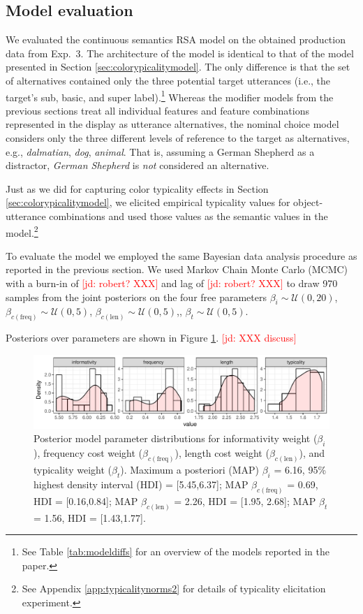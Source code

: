 \documentclass[11pt]{article}
\newcommand{\jd}[1]{\textcolor{Red}{[jd: #1]}}
\newcommand{\tableref}[1]{Table \ref{#1}}
\newcommand{\figref}[1]{Figure \ref{#1}}
\newcommand{\appref}[1]{Appendix \ref{#1}}
\newcommand{\sectionref}[1]{Section \ref{#1}}
\begin{document}
\subsection{Model evaluation}
\label{sec:reflevelmodel}


We evaluated the continuous semantics RSA model on the obtained production data from Exp.~3. The architecture of the model is identical to that of the model presented in \sectionref{sec:colorypicalitymodel}. The only difference is that the set of alternatives contained only the three potential target utterances (i.e., the target's sub, basic, and super label).\footnote{See \tableref{tab:modeldiffs} for an overview of the models reported in the paper.} Whereas the modifier models from the previous sections treat all individual features and feature combinations represented in the display as utterance alternatives, the nominal choice model considers only the three different levels of reference to the target as alternatives, e.g., \emph{dalmatian}, \emph{dog}, \emph{animal}. That is, assuming a German Shepherd as a distractor, \emph{German Shepherd} is \emph{not} considered an alternative.

Just as we did for capturing color typicality effects in \sectionref{sec:colorypicalitymodel}, we elicited empirical typicality values for object-utterance combinations and used those values as the semantic values in the model.\footnote{See \appref{app:typicalitynorms2} for details of typicality elicitation experiment.} 


To evaluate the model we employed the same Bayesian data analysis procedure as reported in the previous section. We used Markov Chain Monte Carlo (MCMC) with a burn-in of \jd{robert? XXX} and lag of \jd{robert? XXX} to draw 970 samples from the joint posteriors on the four free parameters  $\beta_i  \sim \mathcal{U}(0,20)$,  $\beta_{c(\textrm{freq})} \sim \mathcal{U}(0,5)$, $\beta_{c(\textrm{len})} \sim \mathcal{U}(0,5)$,, $\beta_t  \sim \mathcal{U}(0,5)$.

Posteriors over parameters are shown in \figref{fig:nomparamposteriors}. \jd{XXX discuss}

\begin{figure}
\centering
\includegraphics[width=\textwidth]{pics/exp3-paramposteriors}
\caption{Posterior model parameter distributions for informativity weight ($\beta_i$), frequency cost weight  ($\beta_{c(\textrm{freq})}$), length cost weight ($\beta_{c(\textrm{len})}$), and typicality weight ($\beta_t $). Maximum a posteriori (MAP)  $\beta_i$ = 6.16, 95\% highest density interval (HDI) = [5.45,6.37]; MAP $\beta_{c(\textrm{freq})}$ = 0.69, HDI = [0.16,0.84]; MAP $\beta_{c(\textrm{len})}$ = 2.26, HDI = [1.95, 2.68]; MAP $\beta_t $ = 1.56, HDI = [1.43,1.77].}
\label{fig:nomparamposteriors}
\end{figure}
\end{document}
